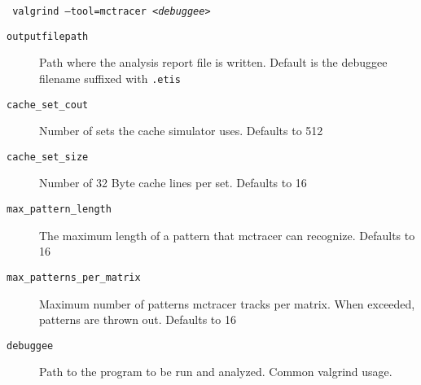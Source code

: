 \texttt{
	valgrind --tool=mctracer \newline
	[--output=<\textit{outputfilepath}>] \newline
	[--cache-sets=<cache\_set\_cout>] \newline
	[--cache-set-size=<cache\_set\_size>] \newline
	[--max-pattern-length=<max\_pattern\_length>] \newline
	[--max-patterns-per-matrix=<max\_patterns\_per\_matrix>] \newline
	<\textit{debuggee}>
}
\begin{description}
\item[\texttt{outputfilepath}] Path where the analysis report file is written. Default is the debuggee filename suffixed with \texttt{.etis}
\item[\texttt{cache\_set\_cout}] Number of sets the cache simulator uses. Defaults to 512
\item[\texttt{cache\_set\_size}] Number of 32 Byte cache lines per set. Defaults to 16
\item[\texttt{max\_pattern\_length}] The maximum length of a pattern that mctracer can recognize. Defaults to 16
\item[\texttt{max\_patterns\_per\_matrix}] Maximum number of patterns mctracer tracks per matrix. When exceeded, patterns are thrown out. Defaults to 16
\item[\texttt{debuggee}] Path to the program to be run and analyzed. Common valgrind usage.
\end{description}

